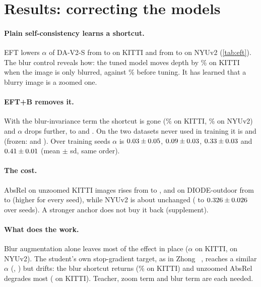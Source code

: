 \section{Results: correcting the models}
\label{sec:eftresults}

\paragraph{Plain self-consistency learns a shortcut.}
EFT lowers $\alpha$ of DA-V2-S from \DavTwoSFixedKittiAlpha{} to \DavTwoSEftKittiAlpha{} on KITTI and
from \DavTwoSFixedNyuAlpha{} to \DavTwoSEftNyuAlpha{} on NYUv2 (\cref{tab:eft}). The blur control reveals how:
the tuned model moves depth by \DavTwoSEftKittiBlur\% on KITTI when the image is only blurred, against
\DavTwoSFixedKittiBlur\% before tuning. It has learned that a blurry image is a zoomed one.

\paragraph{EFT+B removes it.}
With the blur-invariance term the shortcut is gone (\DavTwoSEftbKittiBlur\% on KITTI,
\DavTwoSEftbNyuBlur\% on NYUv2) and $\alpha$ drops further, to \DavTwoSEftbKittiAlpha{} and
\DavTwoSEftbNyuAlpha. On the two datasets never used in training it is \DavTwoSEftbDiodeInAlpha{} and
\DavTwoSEftbDiodeOutAlpha{} (frozen: \DavTwoSFixedDiodeInAlpha{} and \DavTwoSFixedDiodeOutAlpha). Over \eftbSeeds{} training seeds
$\alpha$ is $0.03\pm0.05$, $0.09\pm0.03$,
$0.33\pm0.03$ and $0.41\pm0.01$
(mean $\pm$ sd, same order).

\paragraph{The cost.}
AbsRel on unzoomed KITTI images rises from \DavTwoSFixedKittiAbsrelOne{}
to \DavTwoSEftbKittiAbsrelOne{}, and on DIODE-outdoor from \DavTwoSFixedDiodeOutAbsrelOne{} to
\DavTwoSEftbDiodeOutAbsrelOne{} (higher for every seed), while NYUv2 is about unchanged
(\DavTwoSFixedNyuAbsrelOne{} to $0.326\pm0.026$ over seeds). A stronger
anchor does not buy it back (supplement).

\paragraph{What does the work.}
Blur augmentation alone leaves most of the effect in place ($\alpha$ \DavTwoSBlurKittiAlpha{} on KITTI,
\DavTwoSBlurNyuAlpha{} on NYUv2). The student's own stop-gradient target, as in
Zhong \etal~\cite{zhong2023equivariance}, reaches a similar $\alpha$ (\DavTwoSZhongKittiAlpha,
\DavTwoSZhongNyuAlpha) but drifts: the blur shortcut returns (\DavTwoSZhongKittiBlur\% on KITTI) and unzoomed
AbsRel degrades most (\DavTwoSZhongKittiAbsrelOne{} on KITTI). Teacher, zoom term and blur term are each needed.

